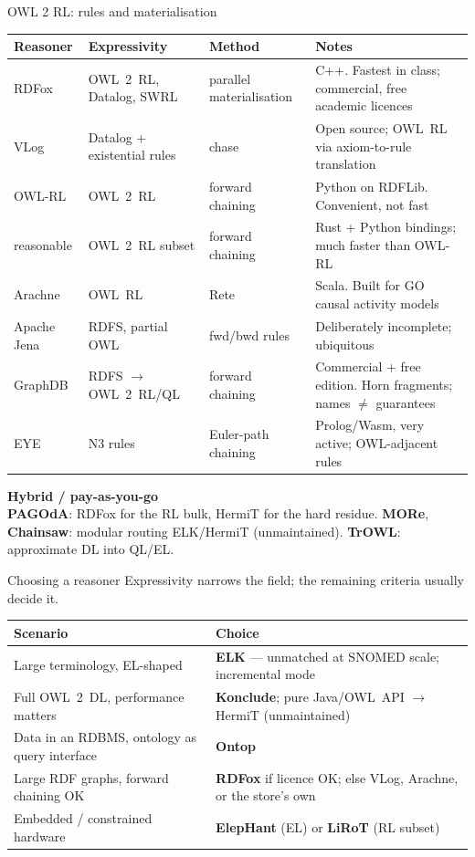 \documentclass[10pt,aspectratio=169,xcolor=table]{beamer}
\begin{document}
\begin{frame}{OWL 2 RL: rules and materialisation}
  \centering\scriptsize
  \begin{tabular}{@{}lllp{6.0cm}@{}}
    \toprule
    \textbf{Reasoner} & \textbf{Expressivity} & \textbf{Method} & \textbf{Notes}\\
    \midrule
    RDFox & OWL~2~RL, Datalog, SWRL & parallel materialisation
      & C++. Fastest in class; commercial, free academic licences\\
    VLog & Datalog + existential rules & chase & Open source; OWL~RL via axiom-to-rule translation\\
    OWL-RL & OWL~2~RL & forward chaining & Python on RDFLib. Convenient, not fast\\
    reasonable & OWL~2~RL subset & forward chaining & Rust + Python bindings; much faster than OWL-RL\\
    Arachne & OWL~RL & Rete & Scala. Built for GO causal activity models\\
    Apache Jena & RDFS, partial OWL & fwd/bwd rules & Deliberately incomplete; ubiquitous\\
    GraphDB & RDFS $\to$ OWL~2~RL/QL & forward chaining
      & Commercial + free edition. Horn fragments; names $\neq$ guarantees\\
    EYE & N3 rules & Euler-path chaining & Prolog/Wasm, very active; OWL-adjacent rules\\
    \bottomrule
  \end{tabular}
  \vspace{0.6em}

  \raggedright
  \textbf{Hybrid / pay-as-you-go}\\[2pt]
  \small
  \textbf{PAGOdA}: RDFox for the RL bulk, HermiT for the hard residue. \;
  \textbf{MORe}, \textbf{Chainsaw}: modular routing ELK/HermiT (unmaintained). \;
  \textbf{TrOWL}: approximate DL into QL/EL.
\end{frame}

\begin{frame}{Choosing a reasoner}
  \small
  Expressivity narrows the field; the remaining criteria usually decide it.
  \vspace{0.5em}

  \centering
  \begin{tabular}{@{}p{5.6cm}p{6.8cm}@{}}
    \toprule
    \textbf{Scenario} & \textbf{Choice}\\
    \midrule
    Large terminology, EL-shaped & \textbf{ELK} --- unmatched at SNOMED scale; incremental mode\\
    Full OWL~2~DL, performance matters & \textbf{Konclude}; pure Java/OWL~API $\to$ HermiT (unmaintained)\\
    Data in an RDBMS, ontology as query interface & \textbf{Ontop}\\
    Large RDF graphs, forward chaining OK & \textbf{RDFox} if licence OK; else VLog, Arachne, or the store's own\\
    Embedded / constrained hardware & \textbf{ElepHant} (EL) or \textbf{LiRoT} (RL subset)\\
    \bottomrule
  \end{tabular}
\end{frame}
\end{document}
